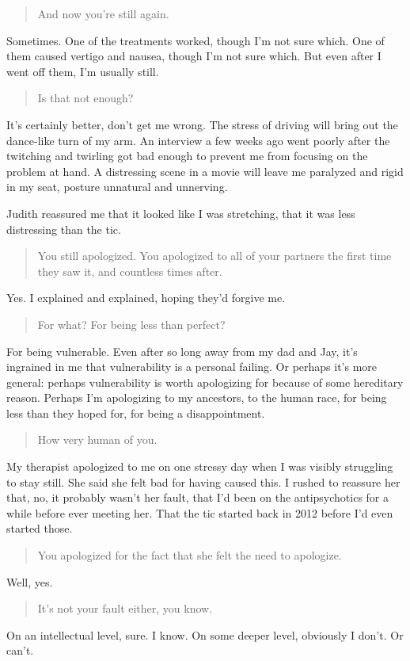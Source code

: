 \begin{quote}
And now you're still again.
\end{quote}

Sometimes. One of the treatments worked, though I'm not sure which. One of them caused vertigo and nausea, though I'm not sure which. But even after I went off them, I'm usually still.

\begin{quote}
Is that not enough?
\end{quote}

It's certainly better, don't get me wrong. The stress of driving will bring out the dance-like turn of my arm. An interview a few weeks ago went poorly after the twitching and twirling got bad enough to prevent me from focusing on the problem at hand. A distressing scene in a movie will leave me paralyzed and rigid in my seat, posture unnatural and unnerving.

Judith reassured me that it looked like I was stretching, that it was less distressing than the tic.

\begin{quote}
You still apologized. You apologized to all of your partners the first time they saw it, and countless times after.
\end{quote}

Yes. I explained and explained, hoping they'd forgive me.

\begin{quote}
For what? For being less than perfect?
\end{quote}

For being vulnerable. Even after so long away from my dad and Jay, it's ingrained in me that vulnerability is a personal failing. Or perhaps it's more general: perhaps vulnerability is worth apologizing for because of some hereditary reason. Perhaps I'm apologizing to my ancestors, to the human race, for being less than they hoped for, for being a disappointment.

\begin{quote}
How very human of you.
\end{quote}

My therapist apologized to me on one stressy day when I was visibly struggling to stay still. She said she felt bad for having caused this. I rushed to reassure her that, no, it probably wasn't her fault, that I'd been on the antipsychotics for a while before ever meeting her. That the tic started back in 2012 before I'd even started those.

\begin{quote}
You apologized for the fact that she felt the need to apologize.
\end{quote}

Well, yes.

\begin{quote}
It's not your fault either, you know.
\end{quote}

On an intellectual level, sure. I know. On some deeper level, obviously I don't. Or can't.

